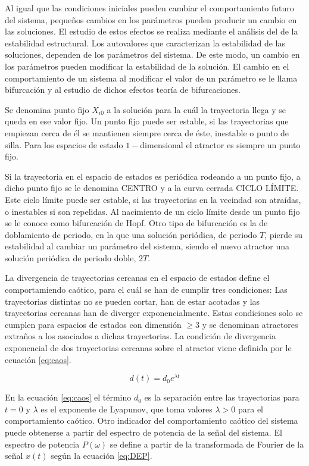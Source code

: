 Al igual que las condiciones iniciales pueden cambiar el comportamiento futuro del sistema, pequeños cambios en los par\'ametros pueden producir un cambio en las soluciones. El estudio de estos efectos se realiza mediante el an\'alisis del de la estabilidad estructural. Los autovalores que caracterizan la estabilidad de las soluciones, dependen de los par\'ametros del sistema. De este modo, un cambio en los par\'ametros pueden modificar la estabilidad de la solución. El cambio en el comportamiento de un sistema al modificar el valor de un par\'ametro se le llama bifurcaci\'on y al estudio de dichos efectos teor\'ia de bifurcaciones.

Se denomina punto fijo $X_{i0}$ a la solución para la cu\'al la trayectoria llega y se queda en ese valor fijo. Un punto fijo puede ser estable, si las trayectorias que empiezan cerca de \'el se mantienen siempre cerca de \'este, inestable o punto de silla. Para los espacios de estado $1-$dimensional el atractor es siempre un punto fijo.

Si la trayectoria en el espacio de estados es periódica rodeando a un punto fijo, a dicho punto fijo se le denomina CENTRO y a la curva cerrada CICLO L\'IMITE. Este ciclo l\'imite puede ser estable, si las trayectorias en la vecindad son atra\'idas, o inestables si son repelidas. Al nacimiento de un ciclo l\'imite desde un punto fijo se le conoce como bifurcaci\'on de Hopf. Otro tipo de bifurcación es la de doblamiento de periodo, en la que una solución periódica, de periodo $T$, pierde su estabilidad al cambiar un parámetro del sistema, siendo el nuevo atractor una solución periódica de periodo doble, $2T$.

La divergencia de trayectorias cercanas en el espacio de estados define el comportamiendo ca\'otico, para el cu\'al se han de cumplir tres condiciones:  Las trayectorias distintas no se pueden cortar, han de estar acotadas y las trayectorias cercanas han de diverger exponencialmente. Estas condiciones solo se cumplen para espacios de estados con dimensión $\geq 3$ y se denominan atractores extraños a los asociados a dichas trayectorias. La condici\'on de divergencia exponencial de dos trayectorias cercanas sobre el atractor viene definida por le ecuaci\'on \ref{eq:caos}.

	\begin{equation}
		d(t) = d_0 e^{\lambda t}
		\label{eq:caos}
	\end{equation}

En la ecuaci\'on \ref{eq:caos} el t\'ermino $d_0$ es la separaci\'on entre las trayectorias para $t = 0$ y $\lambda$ es el exponente de Lyapunov, que toma valores $\lambda > 0$ para el comportamiento ca\'otico. Otro indicador del comportamiento ca\'otico del sistema puede obtenerse a partir del espectro de potencia de la señal del sistema. El espectro de potencia $P(\omega)$ se define a partir de la transformada de Fourier de la señal $x(t)$ seg\'un la ecuaci\'on \ref{eq:DEP}.

